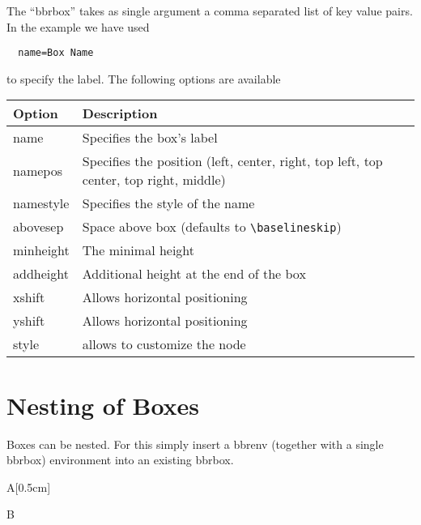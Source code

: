 \documentclass[a4paper]{report}
\begin{document}
  The \enquote{bbrbox} takes as single argument a comma separated list of key value pairs. In the example we have used
  \begin{lstlisting}
  name=Box Name
  \end{lstlisting}
  to specify the label. The following options are available
  
  \begin{center}
  \begin{tabular}{ll}
  \textbf{Option} & \textbf{Description} \\ \hline
  name & Specifies the box's label \\
  namepos & Specifies the position (left, center, right, top left, top center, top right, middle) \\
  namestyle & Specifies the style of the name \\
  abovesep & Space above box (defaults to \lstinline$\baselineskip$) \\
  minheight & The minimal height \\
  addheight & Additional height at the end of the box \\
  xshift & Allows horizontal positioning \\
  yshift & Allows horizontal positioning \\
  style & allows to customize the node
  \end{tabular}
  \end{center}
  
  
  \section{Nesting of Boxes}
  Boxes can be nested. For this simply insert a bbrenv (together with a single bbrbox) environment into an
  existing bbrbox.
  
  \begin{bbrenv}[1cm]{A}[0.5cm]
	  \begin{bbrbox}[name=Box Name]
  
	  \begin{bbrenv}{B}
		  \begin{bbrbox}[name=Inner Box]
		  \end{bbrbox}
	  \end{bbrenv}
  
	  \end{bbrbox}
  \end{bbrenv}
  
\end{document}
